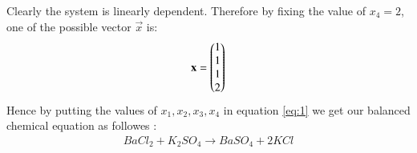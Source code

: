 \documentclass[journal,12pt,twocolumn]{IEEEtran}
\begin{document}
Clearly the system is linearly dependent. Therefore by fixing the value of $x_4=2$, one of the possible vector $\vec{x}$ is:
\begin{align}
    \mathbf{x}=\begin{pmatrix}1\\1\\1\\2\end{pmatrix}
\end{align}
Hence by putting the values of $x_1,x_2,x_3,x_4$ in equation \eqref{eq:1} we get our balanced chemical equation as followes :
\begin{align}
BaCl_2 + K_2SO_4 \rightarrow BaSO_4 + 2KCl
\end{align}
\end{document}
